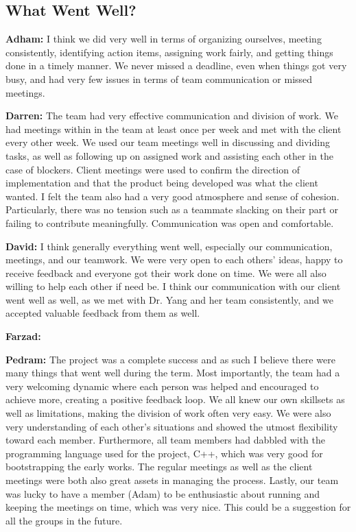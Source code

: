 \documentclass{article}
\begin{document}
\subsection{What Went Well?}

\textbf{Adham:} I think we did very well in terms of organizing ourselves, meeting consistently, identifying action items, assigning work fairly, and getting things done in 
a timely manner. We never missed a deadline, even when things got very busy, and had very few issues in terms of team communication or missed meetings.

\textbf{Darren:} The team had very effective communication and division of work. We had meetings  within in the team at least once per week and met with the client every other week. We used our team meetings well in discussing and dividing tasks, as well as following up on assigned work and assisting each other in the case of blockers. Client meetings were used to confirm the direction of implementation and that the product being developed was what the client wanted. I felt the team also had a very good atmosphere and sense of cohesion. Particularly, there was no tension such as a teammate slacking on their part or failing to contribute meaningfully. Communication was open and comfortable.

\textbf{David:} I think generally everything went well, especially our communication, meetings, and our teamwork. We 
were very open to each others' ideas, happy to receive feedback and everyone got their work done on time. We were all 
also willing to help each other if need be. I think our communication with our client went well as well, as we met with 
Dr. Yang and her team consistently, and we accepted valuable feedback from them as well. 

\textbf{Farzad:}

\textbf{Pedram:} The project was a complete success and as such I believe there were many things that went well during the term. Most importantly, the team had a very welcoming dynamic where each person was helped and encouraged to achieve more, creating a positive feedback loop. We all knew our own skillsets as well as limitations, making the division of work often very easy. We were also very understanding of each other’s situations and showed the utmost flexibility toward each member. Furthermore, all team members had dabbled with the programming language used for the project, C++, which was very good for bootstrapping the early works. The regular meetings as well as the client meetings were both also great assets in managing the process. Lastly, our team was lucky to have a member (Adam) to be enthusiastic about running and keeping the meetings on time, which was very nice. This could be a suggestion for all the groups in the future. 
\end{document}
